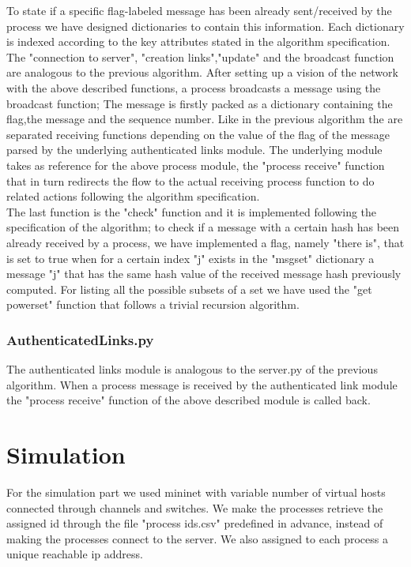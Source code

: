 \documentclass[12pt]{article}
\begin{document}
To state if a specific flag-labeled message has been already sent/received by the process we have designed dictionaries to contain this information. Each dictionary is indexed according to the key attributes stated in the algorithm specification.\\
The "connection to server", "creation links","update" and the broadcast function are analogous to the previous algorithm. After setting up a vision of the network with the above described functions, a process broadcasts a message using the broadcast function; The message is firstly packed as a dictionary containing the flag,the message and the sequence number. Like in the previous algorithm the are separated receiving functions depending on the value of the flag of the message parsed by the underlying authenticated links module. The underlying module takes as reference for the above process module, the "process receive" function that in turn redirects the flow to the actual receiving process function to do related actions following the algorithm specification.\\
The last function is the "check" function and it is implemented following the specification of the algorithm; to check if a message with a certain hash has been already received by a process, we have implemented a flag, namely "there is", that is set to true when for a certain index "j" exists in the "msgset" dictionary a message "j" that has the same hash value of the received message hash previously computed. For listing all the possible subsets of a set we have used the "get powerset" function that follows a trivial recursion algorithm. \\
\subsubsection{AuthenticatedLinks.py}
The authenticated links module is analogous to the server.py of the previous algorithm.   When a process message is received by the authenticated link module the "process receive" function of the above described module is called back. \\

\newpage

\section{Simulation}
For the simulation part we used mininet with variable number of virtual hosts connected through channels and switches. We make the processes retrieve the assigned id through the file "process ids.csv" predefined in advance, instead of making the processes connect to the server. We also assigned to each process a unique reachable ip address. \\
\\
\end{document}

